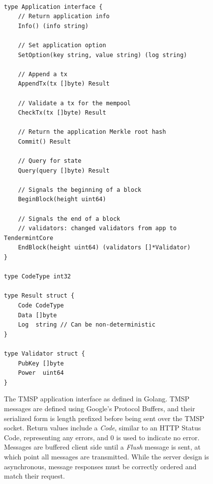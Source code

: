 \begin{figure}[]
    	\centering
\begin{verbatim}

type Application interface {
	// Return application info
	Info() (info string)

	// Set application option
	SetOption(key string, value string) (log string)

	// Append a tx
	AppendTx(tx []byte) Result

	// Validate a tx for the mempool
	CheckTx(tx []byte) Result

	// Return the application Merkle root hash
	Commit() Result

	// Query for state
	Query(query []byte) Result

	// Signals the beginning of a block
	BeginBlock(height uint64) 

	// Signals the end of a block
	// validators: changed validators from app to TendermintCore
	EndBlock(height uint64) (validators []*Validator)
}

type CodeType int32

type Result struct {
	Code CodeType
	Data []byte
	Log  string // Can be non-deterministic
}

type Validator struct {
	PubKey []byte 
	Power  uint64 
}
\end{verbatim}
	\label{fig:tmsp_msgs}
	\caption[TMSP Message Types]{
The TMSP application interface as defined in Golang.
TMSP messages are defined using Google's Protocol Buffers, and their serialized form is length prefixed before 
being sent over the TMSP socket. 
Return values include a \emph{Code}, similar to an HTTP Status Code, representing any errors,
and $0$ is used to indicate no error.
Messages are buffered client side until a \emph{Flush} message is sent,
at which point all messages are transmitted. While the server design is asynchronous, message responses must be correctly ordered and match their request.
}
\end{figure}



